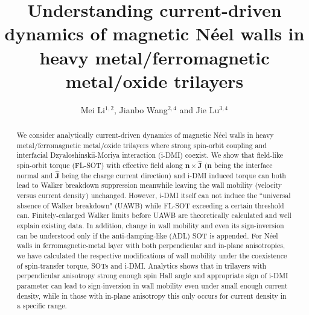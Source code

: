 \documentclass[12pt]{iopart}
\begin{document}
	
\title[]{Understanding current-driven dynamics of magnetic N\'{e}el walls in heavy metal/ferromagnetic metal/oxide trilayers}

\author{Mei Li$^{1,2}$, Jianbo Wang$^{2,4}$ and Jie Lu$^{3,4}$}

\address{$^1$ Physics Department, Shijiazhuang University, Shijiazhuang, Hebei 050035, China}
\address{$^2$ School of Physics and Technology, Center for Electron Microscopy and MOE Key Laboratory of Artificial Micro- and Nano-structures, Wuhan University, Wuhan 430072, China}
\address{$^3$ College of Physics and Information Engineering, Hebei Advanced Thin Films Laboratory, Hebei Normal University, Shijiazhuang 050024, China}
\address{$^4$ Authors to whom any correspondence should be addressed.}



\begin{abstract}
We consider analytically current-driven dynamics of magnetic N\'{e}el walls in 
heavy metal/ferromagnetic metal/oxide trilayers where strong spin-orbit coupling
and interfacial Dzyaloshinskii-Moriya interaction (i-DMI) coexist.
We show that field-like spin-orbit torque (FL-SOT)
with effective field along $\mathbf{n}\times\hat{\mathbf{J}}$ 
($\mathbf{n}$ being the interface normal and $\hat{\mathbf{J}}$ being the charge current direction)
and i-DMI induced torque can both lead to Walker breakdown suppression meanwhile leaving the 
wall mobility (velocity versus current density) unchanged. 
However, i-DMI itself can not induce the ``universal absence of Walker breakdown" (UAWB) 
while FL-SOT exceeding a certain threshold can. 
Finitely-enlarged Walker limits before UAWB are theoretically calculated and well explain existing data.
In addition, change in wall mobility and even its sign-inversion
can be understood only if the anti-damping-like (ADL) SOT is appended.
For N\'{e}el walls in ferromagnetic-metal layer with both perpendicular and in-plane anisotropies,
we have calculated the respective modifications of wall mobility 
under the coexistence of spin-transfer torque, SOTs and i-DMI.
Analytics shows that in trilayers with perpendicular anisotropy strong enough spin Hall angle
and appropriate sign of i-DMI parameter can lead to sign-inversion in wall mobility even under small enough current density,
while in those with in-plane anisotropy this only occurs for current density in a specific range.
\end{abstract}
\end{document}
